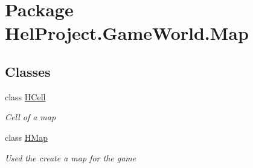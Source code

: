 \hypertarget{namespace_hel_project_1_1_game_world_1_1_map}{}\section{Package Hel\+Project.\+Game\+World.\+Map}
\label{namespace_hel_project_1_1_game_world_1_1_map}
\subsection*{Classes}
\begin{DoxyCompactItemize}
\item 
class \hyperlink{class_hel_project_1_1_game_world_1_1_map_1_1_h_cell}{H\+Cell}
\begin{DoxyCompactList}\small\item\em Cell of a map \end{DoxyCompactList}\item 
class \hyperlink{class_hel_project_1_1_game_world_1_1_map_1_1_h_map}{H\+Map}
\begin{DoxyCompactList}\small\item\em Used the create a map for the game \end{DoxyCompactList}\end{DoxyCompactItemize}
